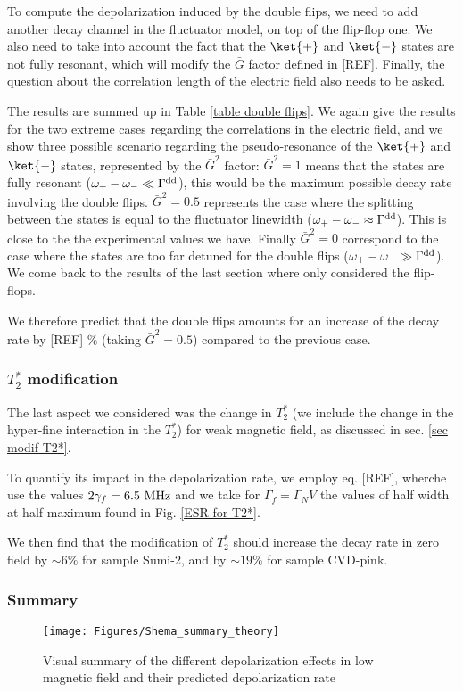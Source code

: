 \documentclass[a4paper,11pt]{report}
\begin{document}
To compute the depolarization induced by the double flips, we need to add another decay channel in the fluctuator model, on top of the flip-flop one. We also need to take into account the fact that the $\ket{+}$ and $\ket{-}$ states are not fully resonant, which will modify the $\bar{G}$ factor defined in [REF]. Finally, the question about the correlation  length of the electric field also needs to be asked.

The results are summed up in Table \ref{table double flips}. We again give the results for the two extreme cases regarding the correlations in the electric field, and we show three possible scenario regarding the pseudo-resonance of the $\ket{+}$ and $\ket{-}$ states, represented by the $\bar{G}^2$ factor: $\bar{G}^2=1$ means that the states are fully resonant ($\omega_+-\omega_- \ll \Gamma^{\rm dd} $), this would be the maximum possible decay rate involving the double flips. $\bar{G}^2=0.5$ represents the case where the splitting between the states is equal to the fluctuator linewidth ($\omega_+-\omega_- \approx \Gamma^{\rm dd}$). This is close to the the experimental values we have. Finally $\bar{G}^2=0$ correspond to the case where the states are too far detuned for the double flips ($\omega_+-\omega_- \gg \Gamma^{\rm dd} $). We come back to the results of the last section where only considered the flip-flops.

We therefore predict that the double flips amounts for an increase of the decay rate by [REF] \% (taking $\bar{G}^2=0.5$) compared to the previous case.

\subsubsection{$T_2^*$ modification}

The last aspect we considered was the change in $T_2^*$ (we include the change in the hyper-fine interaction in the $T_2^*$) for weak magnetic field, as discussed in sec. \ref{sec modif T2*}.

To quantify its impact in the depolarization rate, we employ eq. [REF], wherche use the values $2\gamma_f = 6.5\ \rm MHz$ and we take for $\Gamma_f=\Gamma_NV$ the values of half width at half maximum found in Fig. \ref{ESR for T2*}. 

We then find that the modification of $T_2^*$ should increase the decay rate in zero field by $\sim 6 \%$ for sample Sumi-2, and by $\sim 19 \%$ for sample CVD-pink. 


\subsubsection{Summary}
\begin{figure}[h]
\centering
\texttt{[image: Figures/Shema\_summary\_theory]}
\caption{Visual summary of the different depolarization effects in low magnetic field and their predicted depolarization rate}
\label{summary_theory}
\end{figure}
\end{document}
